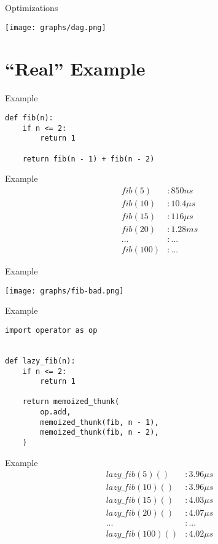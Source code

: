 \documentclass{beamer}
\begin{document}
\begin{frame}{Optimizations}
  \begin{center}
    \texttt{[image: graphs/dag.png]}
  \end{center}
\end{frame}

\section{``Real'' Example}

\begin{frame}[fragile]{Example}
  \begin{verbatim}
def fib(n):
    if n <= 2:
        return 1

    return fib(n - 1) + fib(n - 2)
  \end{verbatim}
\end{frame}

\begin{frame}{Example}
  \begin{align*}
    fib(5) & : 850 ns \\
    fib(10) & :10.4 \mu s \\
    fib(15) & : 116 \mu s \\
    fib(20) & : 1.28 ms \\
    ... & : ... \\
    fib(100) & : ...
  \end{align*}
\end{frame}

\begin{frame}{Example}
  \begin{center}
    \texttt{[image: graphs/fib-bad.png]}
  \end{center}
\end{frame}

\begin{frame}[fragile]{Example}
  \begin{verbatim}
import operator as op


def lazy_fib(n):
    if n <= 2:
        return 1

    return memoized_thunk(
        op.add,
        memoized_thunk(fib, n - 1),
        memoized_thunk(fib, n - 2),
    )
  \end{verbatim}
\end{frame}

\begin{frame}{Example}
  \begin{align*}
    lazy\_fib(5)() & : 3.96 \mu s \\
    lazy\_fib(10)() & : 3.96 \mu s \\
    lazy\_fib(15)() & : 4.03 \mu s \\
    lazy\_fib(20)() & : 4.07 \mu s \\
    ... & : ... \\
    lazy\_fib(100)() & : 4.02 \mu s
  \end{align*}
\end{frame}
\end{document}
